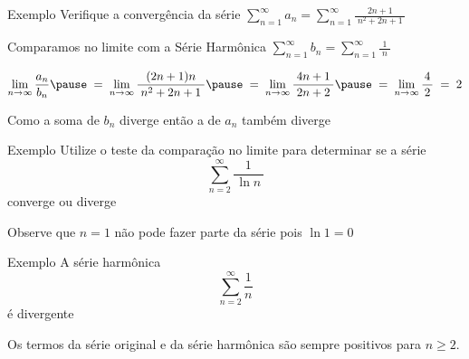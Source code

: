 \addtocounter{exemplo}{1}
\begin{frame}{Exemplo \theexemplo}
  Verifique a convergência da série
  \quad
  \(
    \sum_{n=1}^{\infty} a_n = \sum_{n=1}^{\infty} \frac{2n+1}{\;n^2+2n+1\;}
  \)

  \pause
  \vspace{\baselineskip}
  Comparamos no limite com a Série Harmônica
  \quad
  \(
    \sum_{n=1}^{\infty} b_n = \sum_{n=1}^{\infty} \frac{1}{\;n\;}
  \)

  \pause
  \vspace{0.3\baselineskip}
  \[
  \lim_{n\to\infty} \frac{a_n}{b_n}              \pause \;=\;
  \lim_{n\to\infty} \frac{(2n+1)n}{\;n^2+2n+1\;} \pause \;=\;
  \lim_{n\to\infty} \frac{4n+1}{\;2n+2\;}        \pause \;=\;
  \lim_{n\to\infty} \frac{\,4\,}{2}                     \;=\; 2
  \]

  \pause
  \vspace{0.5\baselineskip}
  Como a soma de \(b_n\) diverge então a de \(a_n\) também diverge
\end{frame}

\addtocounter{exemplo}{1}
\begin{frame}{Exemplo \theexemplo}
  Utilize o teste da comparação no limite para determinar se a série
  \[
    \sum_{n=2}^{\infty} \frac{1}{\,\ln n\,}
  \]
   converge ou diverge

   \pause
   \vspace{\baselineskip}
   Observe que $n=1$ não pode fazer parte da série pois $\ln 1 = 0$
\end{frame}

\begin{frame}{Exemplo \theexemplo}
  A série harmônica
  \[
    \sum_{n=2}^{\infty} \frac{1}{n}
  \]
  é divergente

  \pause
  \vspace{\baselineskip}
  Os termos da série original e da série harmônica são sempre positivos para $n\geq 2$.
\end{frame}

